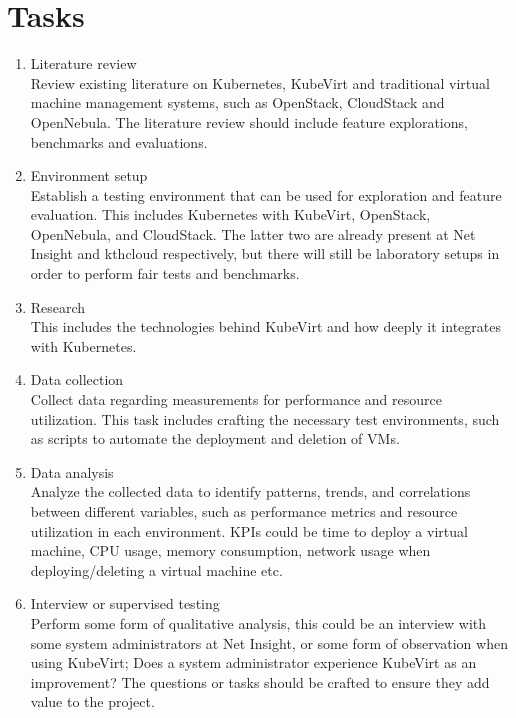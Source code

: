 \documentclass{article}
\begin{document}
\section{Tasks}
\begin{enumerate}
    \item Literature review\\
    Review existing literature on Kubernetes, KubeVirt and traditional virtual machine management systems, such as OpenStack, CloudStack and OpenNebula. The literature review should include feature explorations, benchmarks and evaluations.
    \item Environment setup\\
    Establish a testing environment that can be used for exploration and feature evaluation. This includes Kubernetes with KubeVirt, OpenStack, OpenNebula, and CloudStack. The latter two are already present at Net Insight and kthcloud respectively, but there will still be laboratory setups in order to perform fair tests and benchmarks. 
    \item Research\\
    This includes the technologies behind KubeVirt and how deeply it integrates with Kubernetes.
    \item Data collection\\
    Collect data regarding measurements for performance and resource utilization. This task includes crafting the necessary test environments, such as scripts to automate the deployment and deletion of VMs. 
    \item Data analysis\\
    Analyze the collected data to identify patterns, trends, and correlations between different variables, such as performance metrics and resource utilization in each environment. KPIs could be time to deploy a virtual machine, CPU usage, memory consumption, network usage when deploying/deleting a virtual machine etc.
    \item Interview or supervised testing\\
    Perform some form of qualitative analysis, this could be an interview with some system administrators at Net Insight, or some form of observation when using KubeVirt; Does a system administrator experience KubeVirt as an improvement? The questions or tasks should be crafted to ensure they add value to the project. 
\end{enumerate}
\end{document}
